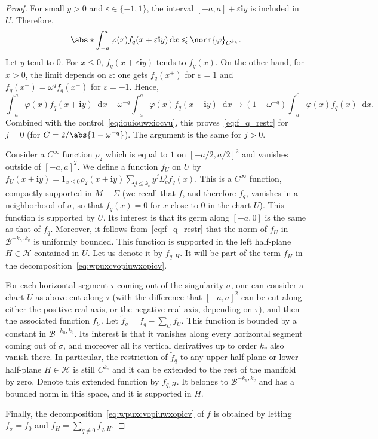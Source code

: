 \documentclass[11pt, a4paper, oneside, final, pagebackref]{amsart}
\newcommand{\boH}{\mathcal{H}}
\newcommand{\boB}{\mathcal{B}}
\newcommand{\dd}{\mathop{}\!\mathrm{d}}
\newcommand{\ic}{\mathbf{i}}
\renewcommand{\epsilon}{\varepsilon}
\renewcommand{\phi}{\varphi}
\renewcommand{\leq}{\leqslant}
\theoremstyle{definition}
\numberwithin{equation}{section}
\begin{document}
\begin{proof}
For small $y>0$ and $\epsilon \in \{-1, 1\}$, the interval $[-a,a]+\epsilon
\ic y$ is included in $U$. Therefore,
\begin{equation}
\label{eq:iouiouwxiocvu}
  \abs*{\int_{-a}^a \phi(x) f_q(x+\epsilon \ic y) \dd x} \leq \norm{\phi}_{C^{k_h}}.
\end{equation}
Let $y$ tend to $0$. For $x \leq 0$, $f_q(x+\epsilon \ic y)$ tends to
$f_q(x)$. On the other hand, for $x>0$, the limit depends on $\epsilon$: one
gets $f_q(x^+)$ for $\epsilon=1$ and $f_q(x^-) = \omega^q f_q(x^+)$ for
$\epsilon = -1$. Hence,
\begin{equation*}
  \int_{-a}^a \phi(x) f_q(x+\ic y) \dd x - \omega^{-q}  \int_{-a}^a \phi(x) f_q(x-\ic y) \dd x
  \to (1-\omega^{-q}) \int_{-a}^0 \phi(x) f_q(x) \dd x.
\end{equation*}
Combined with the control~\eqref{eq:iouiouwxiocvu}, this
proves~\eqref{eq:f_q_restr} for $j=0$ (for $C=2/\abs{1-\omega^{-q}}$). The
argument is the same for $j>0$.

Consider a $C^\infty$ function $\rho_2$ which is equal to $1$ on $[-a/2,
a/2]^2$ and vanishes outside of $[-a,a]^2$. We define a function $f_U$ on $U$
by $f_U(x+\ic y) = 1_{x\leq 0} \rho_2(x+\ic y) \sum_{j\leq k_v} y^j L_v^j
f_q(x)$. This is a $C^\infty$ function, compactly supported in $M-\Sigma$ (we
recall that $f$, and therefore $f_q$, vanishes in a neighborhood of $\sigma$,
so that $f_q(x)=0$ for $x$ close to $0$ in the chart $U$). This function is
supported by $U$. Its interest is that its germ along $[-a,0]$ is the same as
that of $f_q$. Moreover, it follows from~\eqref{eq:f_q_restr} that the norm
of $f_U$ in $\boB^{-k_h, k_v}$ is uniformly bounded. This function is
supported in the left half-plane $H \in \boH$ contained in $U$. Let us denote
it by $f_{q, H}$. It will be part of the term $f_H$ in the
decomposition~\eqref{eq:wpuxcvopiuwxopicv}.

For each horizontal segment $\tau$ coming out of the singularity $\sigma$,
one can consider a chart $U$ as above cut along $\tau$ (with the difference
that $[-a,a]^2$ can be cut along either the positive real axis, or the
negative real axis, depending on $\tau$), and then the associated function
$f_U$. Let $\tilde f_q = f_q -\sum_U f_U$. This function is bounded by a
constant in $\boB^{-k_h, k_v}$. Its interest is that it vanishes along every
horizontal segment coming out of $\sigma$, and moreover all its vertical
derivatives up to order $k_v$ also vanish there. In particular, the
restriction of $\tilde f_q$ to any upper half-plane or lower half-plane $H\in
\boH$ is still $C^{k_v}$ and it can be extended to the rest of the manifold
by zero. Denote this extended function by $f_{q, H}$. It belongs to
$\boB^{-k_h, k_v}$ and has a bounded norm in this space, and it is supported
in $H$.

Finally, the decomposition~\eqref{eq:wpuxcvopiuwxopicv} of $f$ is obtained by
letting $f_\sigma=f_0$ and $f_H = \sum_{q\neq 0} f_{q,H}$.
\end{proof}
\end{document}
